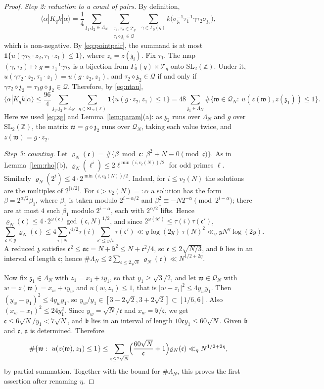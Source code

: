 \documentclass[11pt]{amsart}
\theoremstyle{remark}
\theoremstyle{definition}
\numberwithin{equation}{section}
\newcommand{\Qc}{\mathcal{Q}}
\newcommand{\Tc}{\mathcal{T}}
\newcommand{\Z}{\mathbb{Z}}
\newcommand{\ga}{\mathfrak{a}}
\newcommand{\gb}{\mathfrak{b}}
\newcommand{\gc}{\mathfrak{c}}
\newcommand{\gz}{\mathfrak{z}}
\newcommand{\gw}{\mathfrak{w}}
\newcommand{\SL}{\mathrm{SL}}
\newcommand{\one}{\mathbf{1}}
\newcommand{\br}[1]{\langle #1\rangle}
\begin{document}
\begin{proof}
\emph{Step 2: reduction to a count of pairs.} By definition,
\[
\br{\alpha|K_qk|\alpha}=\frac14\sum_{\gz_1,\gz_2\in\Lambda_N}\ \sum_{\substack{\tau_1,\tau_2\in\Tc_q\\ \tau_i\diamond\gz_i\in\Qc}}\ \sum_{\gamma\in\Gamma_0(q)}k\bigl(\sigma_{\gz_1}^{-1}\tau_1^{-1}\gamma\tau_2\sigma_{\gz_2}\bigr),
\]
which is non-negative. By \eqref{eq:pointpair}, the summand is at most $\one\{u(\gamma\tau_2\cdot z_2,\tau_1\cdot z_1)\le1\}$, where $z_i=z(\gz_i)$. Fix $\tau_1$. The map $(\gamma,\tau_2)\mapsto g=\tau_1^{-1}\gamma\tau_2$ is a bijection from $\Gamma_0(q)\times\Tc_q$ onto $\SL_2(\Z)$. Under it, $u(\gamma\tau_2\cdot z_2,\tau_1\cdot z_1)=u(g\cdot z_2,z_1)$, and $\tau_2\diamond\gz_2\in\Qc$ if and only if $\gamma\tau_2\diamond\gz_2=\tau_1g\diamond\gz_2\in\Qc$. Therefore, by \eqref{eq:ntau},
\[
\br{\alpha|K_qk|\alpha}\le\frac{96}4\sum_{\gz_1,\gz_2\in\Lambda_N}\ \sum_{g\in\SL_2(\Z)}\one\{u(g\cdot z_2,z_1)\le1\}=48\sum_{\gz_1\in\Lambda_N}\#\bigl\{\gw\in\Qc_N:\ u(z(\gw),z(\gz_1))\le1\bigr\}.
\]
Here we used \eqref{eq:zg} and Lemma~\ref{lem:param}(a): as $\gz_2$ runs over $\Lambda_N$ and $g$ over $\SL_2(\Z)$, the matrix $\gw=g\diamond\gz_2$ runs over $\Qc_N$, taking each value twice, and $z(\gw)=g\cdot z_2$.

\emph{Step 3: counting.} Let $\varrho_N(\gc)=\#\{\beta\bmod\gc:\ \beta^2+N\equiv0\pmod\gc\}$. As in Lemma~\ref{lem:rho}(b), $\varrho_N(\ell^i)\le2\ell^{\min(i,v_\ell(N))/2}$ for odd primes $\ell$. Similarly $\varrho_N(2^i)\le4\cdot2^{\min(i,v_2(N))/2}$. Indeed, for $i\le v_2(N)$ the solutions are the multiples of $2^{\lceil i/2\rceil}$. For $i>v_2(N)=:\alpha$ a solution has the form $\beta=2^{\alpha/2}\beta_1$, where $\beta_1$ is taken modulo $2^{i-\alpha/2}$ and $\beta_1^2\equiv-N2^{-\alpha}\pmod{2^{i-\alpha}}$; there are at most $4$ such $\beta_1$ modulo $2^{i-\alpha}$, each with $2^{\alpha/2}$ lifts. Hence $\varrho_N(\gc)\le4\cdot2^{\omega(\gc)}\gcd(\gc,N)^{1/2}$, and since $2^{\omega(i\gc')}\le\tau(i)\tau(\gc')$,
\[
\sum_{\gc\le y}\varrho_N(\gc)\le4\sum_{i\mid N}i^{1/2}\tau(i)\sum_{\gc'\le y/i}\tau(\gc')\ll y\log(2y)\,\tau(N)^2\ll_\eta yN^{\eta}\log(2y).
\]
A reduced $\gz$ satisfies $\gc^2\le\ga\gc=N+\gb^2\le N+\gc^2/4$, so $\gc\le2\sqrt{N/3}$, and $\gb$ lies in an interval of length $\gc$; hence $\#\Lambda_N\le2\sum_{\gc\le2\sqrt N}\varrho_N(\gc)\ll N^{1/2+2\eta}$.

Now fix $\gz_1\in\Lambda_N$ with $z_1=x_1+iy_1$, so that $y_1\ge\sqrt3/2$, and let $\gw\in\Qc_N$ with $w=z(\gw)=x_w+iy_w$ and $u(w,z_1)\le1$, that is $|w-z_1|^2\le4y_wy_1$. Then $(y_w-y_1)^2\le4y_wy_1$, so $y_w/y_1\in[3-2\sqrt2,3+2\sqrt2]\subset[1/6,6]$. Also $(x_w-x_1)^2\le24y_1^2$. Since $y_w=\sqrt N/\gc$ and $x_w=\gb/\gc$, we get $\gc\le6\sqrt N/y_1<7\sqrt N$, and $\gb$ lies in an interval of length $10\gc y_1\le60\sqrt N$. Given $\gb$ and $\gc$, $\ga$ is determined. Therefore
\[
\#\{\gw:\ u(z(\gw),z_1)\le1\}\le\sum_{\gc\le7\sqrt N}\Bigl(\frac{60\sqrt N}{\gc}+1\Bigr)\varrho_N(\gc)\ll_\eta N^{1/2+2\eta},
\]
by partial summation. Together with the bound for $\#\Lambda_N$, this proves the first assertion after renaming $\eta$.


\end{proof}
\end{document}
